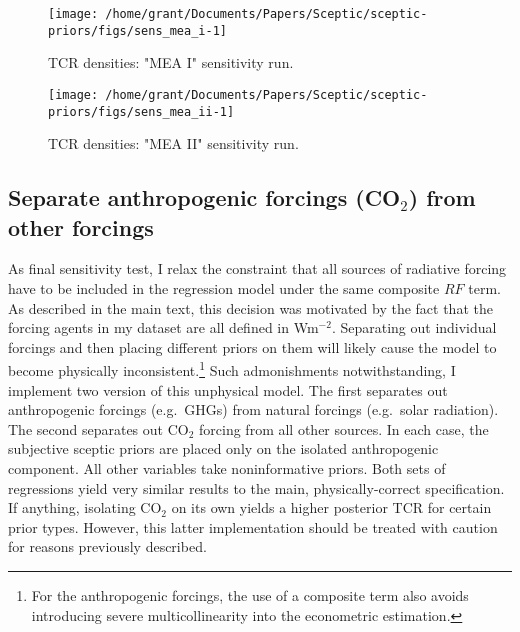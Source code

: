 \documentclass[
]{article}
\begin{document}
\begin{figure}[H]

{\centering \texttt{[image: /home/grant/Documents/Papers/Sceptic/sceptic-priors/figs/sens\_mea\_i-1]} 

}

\caption{TCR densities: "MEA I" sensitivity run.}\label{fig:sens_mea_i}
\end{figure}

\begin{figure}[H]

{\centering \texttt{[image: /home/grant/Documents/Papers/Sceptic/sceptic-priors/figs/sens\_mea\_ii-1]} 

}

\caption{TCR densities: "MEA II" sensitivity run.}\label{fig:sens_mea_ii}
\end{figure}

\newpage
\pagebreak

\hypertarget{separate-anthropogenic-forcings-co_2-from-other-forcings}{%
\subsection{\texorpdfstring{Separate anthropogenic forcings (CO\(_2\))
from other
forcings}{Separate anthropogenic forcings (CO\_2) from other forcings}}\label{separate-anthropogenic-forcings-co_2-from-other-forcings}}

As final sensitivity test, I relax the constraint that all sources of
radiative forcing have to be included in the regression model under the
same composite \(RF\) term. As described in the main text, this decision
was motivated by the fact that the forcing agents in my dataset are all
defined in Wm\(^{-2}\). Separating out individual forcings and then
placing different priors on them will likely cause the model to become
physically inconsistent.\footnote{For the anthropogenic forcings, the
  use of a composite term also avoids introducing severe
  multicollinearity into the econometric estimation.} Such admonishments
notwithstanding, I implement two version of this unphysical model. The
first separates out anthropogenic forcings (e.g.~GHGs) from natural
forcings (e.g.~solar radiation). The second separates out CO\(_2\)
forcing from all other sources. In each case, the subjective sceptic
priors are placed only on the isolated anthropogenic component. All
other variables take noninformative priors. Both sets of regressions
yield very similar results to the main, physically-correct
specification. If anything, isolating CO\(_2\) on its own yields a
higher posterior TCR for certain prior types. However, this latter
implementation should be treated with caution for reasons previously
described.
\end{document}
